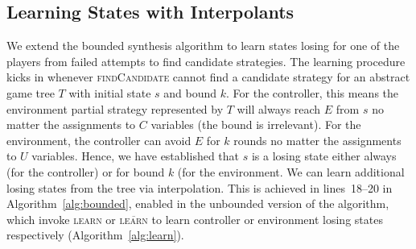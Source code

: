\documentclass{llncs}
\newcommand{\textoverline}[1]{$\overline{\mbox{#1}}$}
\begin{document}

\subsection{Learning States with Interpolants}

We extend the bounded synthesis algorithm to learn states losing for one of the
players from failed attempts to find candidate strategies.  The learning
procedure kicks in whenever \textsc{findCandidate} cannot find a candidate
strategy for an abstract game tree $T$ with initial state $s$ and bound $k$.
For the controller, this means the environment partial strategy represented by $T$
will always reach $E$ from $s$ no matter the assignments to $C$ variables (the
bound is irrelevant).  For the environment, the controller can avoid $E$ for $k$
rounds no matter the assignments to $U$ variables. Hence, we have established
that $s$ is a losing state either always (for the controller) or for bound $k$ (for
the environment. We can learn additional losing states from the tree via
interpolation.  This is achieved in lines~18--20 in
Algorithm~\ref{alg:bounded}, enabled in the unbounded version of the algorithm,
which invoke \textsc{learn} or \textsc{\textoverline{learn}} to learn
controller or environment losing states respectively
(Algorithm~\ref{alg:learn}).
\end{document}
